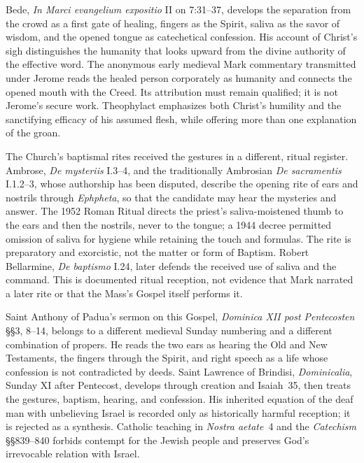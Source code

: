 Bede, \emph{In Marci evangelium expositio} II on 7:31--37, develops the
separation from the crowd as a first gate of healing, fingers as the Spirit,
saliva as the savor of wisdom, and the opened tongue as catechetical
confession. His account of Christ's sigh distinguishes the humanity that
looks upward from the divine authority of the effective word. The anonymous
early medieval Mark commentary transmitted under Jerome reads the healed
person corporately as humanity and connects the opened mouth with the Creed.
Its attribution must remain qualified; it is not Jerome's secure work.
Theophylact emphasizes both Christ's humility and the sanctifying efficacy of
his assumed flesh, while offering more than one explanation of the groan.

The Church's baptismal rites received the gestures in a different, ritual
register. Ambrose, \emph{De mysteriis} I.3--4, and the traditionally
Ambrosian \emph{De sacramentis} I.1.2--3, whose authorship has been disputed,
describe the opening rite of ears and nostrils through
\emph{Ephpheta}, so that the candidate may hear the mysteries and answer.
The 1952 Roman Ritual directs the priest's saliva-moistened thumb to the ears
and then the nostrils, never to the tongue; a 1944 decree permitted omission
of saliva for hygiene while retaining the touch and formulas. The rite is
preparatory and exorcistic, not the matter or form of Baptism.
Robert Bellarmine, \emph{De baptismo} I.24, later defends the received use of
saliva and the command. This is documented ritual reception, not evidence
that Mark narrated a later rite or that the Mass's Gospel itself performs it.

Saint Anthony of Padua's sermon on this Gospel, \emph{Dominica XII post
Pentecosten} §§3, 8--14, belongs to a different medieval Sunday numbering and a
different combination of propers. He reads the two ears as hearing the Old
and New Testaments, the fingers through the Spirit, and right speech as a life
whose confession is not contradicted by deeds. Saint Lawrence of Brindisi,
\emph{Dominicalia}, Sunday XI after Pentecost, develops
 through creation and Isaiah~35, then treats the
gestures, baptism, hearing, and confession. His inherited equation of the
deaf man with unbelieving Israel is recorded only as historically harmful
reception; it is rejected as a synthesis. Catholic teaching in
\emph{Nostra aetate}~4 and the \emph{Catechism} §§839--840 forbids contempt
for the Jewish people and preserves God's irrevocable relation with Israel.

